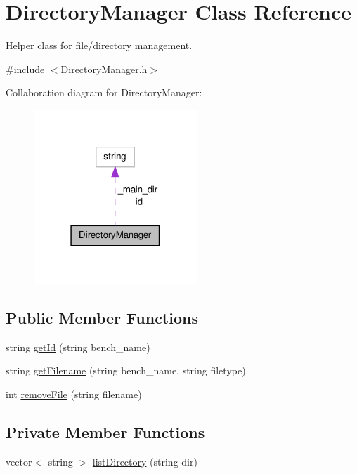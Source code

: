 \hypertarget{classDirectoryManager}{\section{Directory\-Manager Class Reference}
\label{classDirectoryManager}
}


Helper class for file/directory management.  




{\ttfamily \#include $<$Directory\-Manager.\-h$>$}



Collaboration diagram for Directory\-Manager\-:\nopagebreak
\begin{figure}[H]
\begin{center}
\leavevmode
\includegraphics[width=174pt]{classDirectoryManager__coll__graph}
\end{center}
\end{figure}
\subsection*{Public Member Functions}
\begin{DoxyCompactItemize}
\item 
string \hyperlink{classDirectoryManager_afafee962b3f36fa376819f492097c77a}{get\-Id} (string bench\-\_\-name)
\item 
string \hyperlink{classDirectoryManager_ae01c75b213a73975e2754267b1c30201}{get\-Filename} (string bench\-\_\-name, string filetype)
\item 
int \hyperlink{classDirectoryManager_a7c8813adf4847e64414ce0e66fe701ec}{remove\-File} (string filename)
\end{DoxyCompactItemize}
\subsection*{Private Member Functions}
\begin{DoxyCompactItemize}
\item 
vector$<$ string $>$ \hyperlink{classDirectoryManager_a896f7cb505e4f031c111cbee1abf79f6}{list\-Directory} (string dir)
\end{DoxyCompactItemize}
